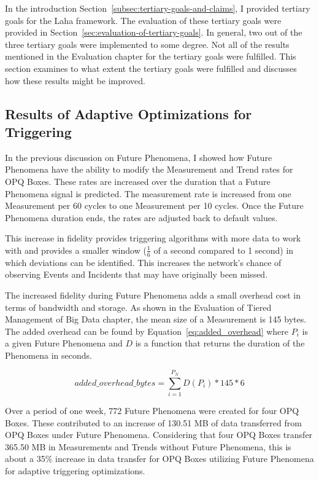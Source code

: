 In the introduction Section~\ref{subsec:tertiary-goals-and-claims}, I provided tertiary goals for the Laha framework. The evaluation of these tertiary goals were provided in Section~\ref{sec:evaluation-of-tertiary-goals}. In general, two out of the three tertiary goals were implemented to some degree. Not all of the results mentioned in the Evaluation chapter for the tertiary goals were fulfilled. This section examines to what extent the tertiary goals were fulfilled and discusses how these results might be improved.

\subsection{Results of Adaptive Optimizations for Triggering}\label{subsec:results-of-adaptive-optimizations-for-triggering}

In the previous discussion on Future Phenomena, I showed how Future Phenomena have the ability to modify the Measurement and Trend rates for OPQ Boxes. These rates are increased over the duration that a Future Phenomena signal is predicted. The measurement rate is increased from one Measurement per 60 cycles to one Measurement per 10 cycles. Once the Future Phenomena duration ends, the rates are adjusted back to default values.

This increase in fidelity provides triggering algorithms with more data to work with and provides a smaller window ($\frac{1}{6}$ of a second compared to 1 second) in which deviations can be identified. This increases the network's chance of observing Events and Incidents that may have originally been missed.

The increased fidelity during Future Phenomena adds a small overhead cost in terms of bandwidth and storage. As shown in the Evaluation of Tiered Management of Big Data chapter, the mean size of a Measurement is 145 bytes. The added overhead can be found by Equation~\ref{eq:added_overhead} where $P_i$ is a given Future Phenomena and $D$ is a function that returns the duration of the Phenomena in seconds.

\begin{equation}
    added\_overhead\_bytes = \sum_{i=1}^{P_{N}} D(P_i) * 145 * 6
    \label{eq:added_overhead}
\end{equation}

Over a period of one week, 772 Future Phenomena were created for four OPQ Boxes. These contributed to an increase of 130.51 MB of data transferred from OPQ Boxes under Future Phenomena. Considering that four OPQ Boxes transfer 365.50 MB in Measurements and Trends without Future Phenomena, this is about a 35\% increase in data transfer for OPQ Boxes utilizing Future Phenomena for adaptive triggering optimizations.


